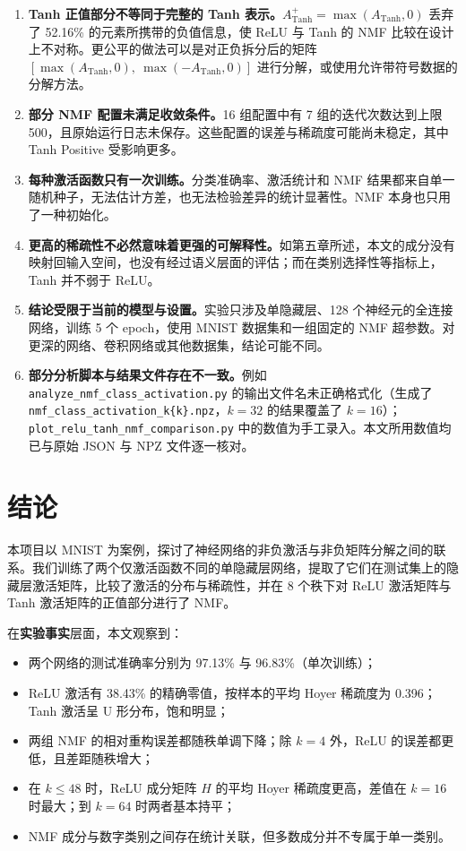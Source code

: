 \documentclass[UTF8,a4paper,11pt]{ctexart}
\newcommand{\Atanh}{A_{\mathrm{Tanh}}}
\newcommand{\Apos}{A^{+}_{\mathrm{Tanh}}}
\newcommand{\code}[1]{\texttt{\small #1}}
\begin{document}
\begin{enumerate}
  \item \textbf{Tanh 正值部分不等同于完整的 Tanh 表示。}$\Apos=\max(\Atanh,0)$ 丢弃了 52.16\% 的元素所携带的负值信息，使 ReLU 与 Tanh 的 NMF 比较在设计上不对称。更公平的做法可以是对正负拆分后的矩阵 $[\max(\Atanh,0),\ \max(-\Atanh,0)]$ 进行分解，或使用允许带符号数据的分解方法。
  \item \textbf{部分 NMF 配置未满足收敛条件。}16 组配置中有 7 组的迭代次数达到上限 500，且原始运行日志未保存。这些配置的误差与稀疏度可能尚未稳定，其中 Tanh Positive 受影响更多。
  \item \textbf{每种激活函数只有一次训练。}分类准确率、激活统计和 NMF 结果都来自单一随机种子，无法估计方差，也无法检验差异的统计显著性。NMF 本身也只用了一种初始化。
  \item \textbf{更高的稀疏性不必然意味着更强的可解释性。}如第五章所述，本文的成分没有映射回输入空间，也没有经过语义层面的评估；而在类别选择性等指标上，Tanh 并不弱于 ReLU。
  \item \textbf{结论受限于当前的模型与设置。}实验只涉及单隐藏层、128 个神经元的全连接网络，训练 5 个 epoch，使用 MNIST 数据集和一组固定的 NMF 超参数。对更深的网络、卷积网络或其他数据集，结论可能不同。
  \item \textbf{部分分析脚本与结果文件存在不一致。}例如 \code{analyze\_nmf\_class\_activation.py} 的输出文件名未正确格式化（生成了 \code{nmf\_class\_activation\_k\{k\}.npz}，$k=32$ 的结果覆盖了 $k=16$）；\code{plot\_relu\_tanh\_nmf\_comparison.py} 中的数值为手工录入。本文所用数值均已与原始 JSON 与 NPZ 文件逐一核对。
\end{enumerate}

\section{结论}

本项目以 MNIST 为案例，探讨了神经网络的非负激活与非负矩阵分解之间的联系。我们训练了两个仅激活函数不同的单隐藏层网络，提取了它们在测试集上的隐藏层激活矩阵，比较了激活的分布与稀疏性，并在 8 个秩下对 ReLU 激活矩阵与 Tanh 激活矩阵的正值部分进行了 NMF。

在\textbf{实验事实}层面，本文观察到：
\begin{itemize}
  \item 两个网络的测试准确率分别为 97.13\% 与 96.83\%（单次训练）；
  \item ReLU 激活有 38.43\% 的精确零值，按样本的平均 Hoyer 稀疏度为 0.396；Tanh 激活呈 U 形分布，饱和明显；
  \item 两组 NMF 的相对重构误差都随秩单调下降；除 $k=4$ 外，ReLU 的误差都更低，且差距随秩增大；
  \item 在 $k\le48$ 时，ReLU 成分矩阵 $H$ 的平均 Hoyer 稀疏度更高，差值在 $k=16$ 时最大；到 $k=64$ 时两者基本持平；
  \item NMF 成分与数字类别之间存在统计关联，但多数成分并不专属于单一类别。
\end{itemize}
\end{document}
